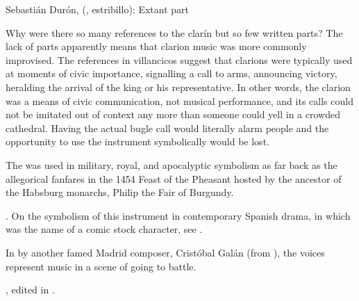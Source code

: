 \begin{musicexample}
    \caption{Sebastián Durón,  (,
    estribillo): Extant  part}
    \label{mus:Duron-Dulce_armonia_clarin}
\end{musicexample}

Why were there so many references to the clarín but so few written parts?
The lack of parts apparently means that clarion music was more commonly
improvised.  
The references in villancicos suggest that clarions were typically used at
moments of civic importance, signalling a call to arms, announcing victory,
heralding the arrival of the king or his representative.
In other words, the clarion was a means of civic communication, not musical
performance, and its calls could not be imitated out of context any more than
someone could yell  in a crowded cathedral.
Having the actual bugle call would literally alarm people and the
opportunity to use the instrument symbolically would be lost.

The  was used in military, royal, and apocalyptic symbolism as far
back as the allegorical  fanfares in the 1454 Feast of the
Pheasant hosted by the ancestor of the Habsburg monarchs, Philip the Fair of
Burgundy.%
\begin{Footnote}
    \Autocites
    [340--380]{LaMarche:Memoires}
    {Bloxam:JNV}
    {Perkins:Patronage15C}.
    On the symbolism of this instrument in contemporary Spanish drama, in which
     was the name of a comic stock character, see
    \autocite{Damjanovic:Clarin}.
\end{Footnote}
In  by another famed Madrid composer, Cristóbal
Galán (from ), the voices represent  music in a scene
of  going to battle.%
\begin{Footnote} 
    , 
    edited in \autocite[555--565]{CaberoPueyo:PhD}.
\end{Footnote}


